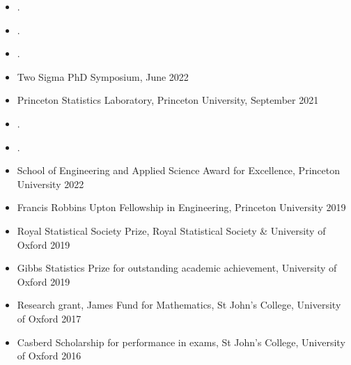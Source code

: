 \documentclass[
  date,
  number,
]{wgu-cv}
\begin{document}
\begin{itemize}
  \item {}.
  \item {}.
\end{itemize}

\begin{itemize}
  \item {}.
\end{itemize}

\begin{itemize}
  \item Two Sigma PhD Symposium, June 2022
  \item Princeton Statistics Laboratory, Princeton University, September 2021
\end{itemize}

\begin{itemize}
  \item {}.
  \item {}.
\end{itemize}

\vspace*{-4mm}


\vspace*{-2mm}

\begin{itemize}
  \item School of Engineering and Applied Science Award for Excellence,
    Princeton University
    \hfill 2022%
  \item Francis Robbins Upton Fellowship in Engineering,
    Princeton University
    \hfill 2019%
  \item Royal Statistical Society Prize,
    Royal Statistical Society \& University of Oxford
    \hfill 2019%
  \item Gibbs Statistics Prize for outstanding academic achievement,
    University of Oxford
    \hfill 2019%
  \item Research grant, James Fund for Mathematics,
    St John's College, University of Oxford
    \hfill 2017%
  \item Casberd Scholarship for performance in exams,
    St John's College, University of Oxford
    \hfill 2016%
\end{itemize}
\end{document}
